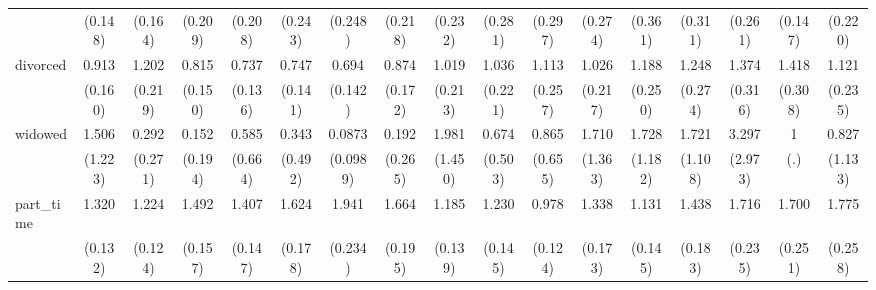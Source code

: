 {\begin{tabular}{l*{16}{c}}
                    &     (0.148)         &     (0.164)         &     (0.209)         &     (0.208)         &     (0.243)         &     (0.248)         &     (0.218)         &     (0.232)         &     (0.281)         &     (0.297)         &     (0.274)         &     (0.361)         &     (0.311)         &     (0.261)         &     (0.147)         &     (0.220)         \\
[1em]
divorced            &       0.913         &       1.202         &       0.815         &       0.737         &       0.747         &       0.694         &       0.874         &       1.019         &       1.036         &       1.113         &       1.026         &       1.188         &       1.248         &       1.374         &       1.418         &       1.121         \\
                    &     (0.160)         &     (0.219)         &     (0.150)         &     (0.136)         &     (0.141)         &     (0.142)         &     (0.172)         &     (0.213)         &     (0.221)         &     (0.257)         &     (0.217)         &     (0.250)         &     (0.274)         &     (0.316)         &     (0.308)         &     (0.235)         \\
[1em]
widowed             &       1.506         &       0.292         &       0.152         &       0.585         &       0.343         &      0.0873\sym{*}  &       0.192         &       1.981         &       0.674         &       0.865         &       1.710         &       1.728         &       1.721         &       3.297         &           1         &       0.827         \\
                    &     (1.223)         &     (0.271)         &     (0.194)         &     (0.664)         &     (0.492)         &    (0.0989)         &     (0.265)         &     (1.450)         &     (0.503)         &     (0.655)         &     (1.363)         &     (1.182)         &     (1.108)         &     (2.973)         &         (.)         &     (1.133)         \\
[1em]
part\_time           &       1.320\sym{**} &       1.224\sym{*}  &       1.492\sym{***}&       1.407\sym{**} &       1.624\sym{***}&       1.941\sym{***}&       1.664\sym{***}&       1.185         &       1.230         &       0.978         &       1.338\sym{*}  &       1.131         &       1.438\sym{**} &       1.716\sym{***}&       1.700\sym{***}&       1.775\sym{***}\\
                    &     (0.132)         &     (0.124)         &     (0.157)         &     (0.147)         &     (0.178)         &     (0.234)         &     (0.195)         &     (0.139)         &     (0.145)         &     (0.124)         &     (0.173)         &     (0.145)         &     (0.183)         &     (0.235)         &     (0.251)         &     (0.258)         \\

\end{tabular}}
